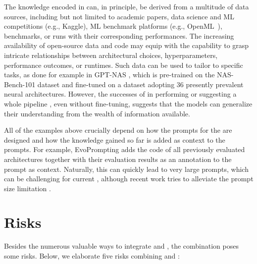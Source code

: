 The knowledge encoded in \LLMs can, in principle, be derived from a multitude of data sources, including but not limited to academic papers, data science and ML competitions (e.g., Kaggle), ML benchmark platforms (e.g., OpenML~\cite{casalicchio-19a}), \AutoML benchmarks, or \AutoML runs with their corresponding performances.
The increasing availability of open-source data and code may equip \LLMs with the capability to grasp intricate relationships between architectural choices, hyperparameters, performance outcomes, or runtimes.
Such data can be used to tailor \LLMs to specific tasks, as done for example in GPT-NAS \cite{yu2023gptnas}, which is pre-trained on the NAS-Bench-101 dataset \cite{ying-icml19a} and fine-tuned on a dataset adopting 36 presently prevalent neural architectures. However, the successes of \LLMs in performing \NAS \cite{zheng2023gpt4} or suggesting a whole \AutoML pipeline \cite{zhang-arxiv23a, zhang-arxiv23b}, even without fine-tuning, suggests that the models can generalize their understanding from the wealth of information available.

All of the examples above crucially depend on how the prompts for the \LLM are designed and how the knowledge gained so far is added as context to the prompts. For example, EvoPrompting \cite{chen2023evoprompting} adds the code of all previously evaluated architectures together with their evaluation results as an annotation to the prompt as context. Naturally, this can quickly lead to very large prompts, which can be challenging for current \LLMs, although recent work tries to alleviate the prompt size limitation \cite{yu-arxiv23a}.

\section{Risks}
\label{llm-sec:dangers-and-challenges}

Besides the numerous valuable ways to integrate \LLMs and \AutoML, the combination poses some risks. Below, we elaborate five risks combining \LLMs and \AutoML:

